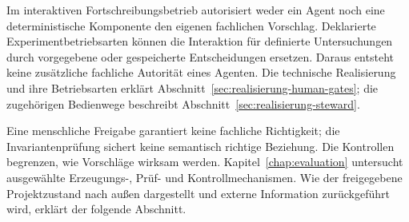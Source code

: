 Im interaktiven Fortschreibungsbetrieb autorisiert weder ein Agent
noch eine deterministische Komponente den eigenen fachlichen
Vorschlag. Deklarierte Experimentbetriebsarten können die
Interaktion für definierte Untersuchungen durch vorgegebene oder
gespeicherte Entscheidungen ersetzen. Daraus entsteht keine
zusätzliche fachliche Autorität eines Agenten. Die technische
Realisierung und ihre Betriebsarten erklärt
Abschnitt~\ref{sec:realisierung-human-gates};
die zugehörigen Bedienwege beschreibt
Abschnitt~\ref{sec:realisierung-steward}.

Eine menschliche Freigabe garantiert keine fachliche Richtigkeit;
die Invariantenprüfung sichert keine semantisch richtige Beziehung.
Die Kontrollen begrenzen, wie Vorschläge wirksam werden.
Kapitel~\ref{chap:evaluation} untersucht ausgewählte Erzeugungs-,
Prüf- und Kontrollmechanismen. Wie der freigegebene Projektzustand
nach außen dargestellt und externe Information zurückgeführt wird,
erklärt der folgende Abschnitt.

